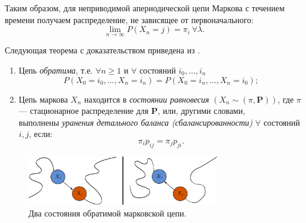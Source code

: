 \documentclass[14pt,a4paper]{article}
\begin{document}
Таким образом, для неприводимой апериодической цепи Маркова с течением времени получаем распределение, не зависящее от первоначального:
\begin{equation}
    \lim_{n \to \infty}P(X_n = j) = \pi_i\   \forall \lambda.
\end{equation}


Следующая теорема с доказательством приведена из \cite{kelb}.
\begin{Th}
\begin{enumerate} Пусть $X_n$ --- цепь Маркова. Следующие свойства эквивалентны:
    \item Цепь \textit{обратима}, т.е. $\forall n \geqslant 1$ и $\forall$ состояний $i_0, \dots, i_n$
    \begin{equation}
        P(X_0 = i_0, \dots, X_n = i_n) = P(X_0 = i_n, \dots, X_n = i_0);
    \end{equation}
    \item Цепь маркова $X_n$ находится в \textit{состоянии равновесия} $\left(X_n \sim (\pi, \mathbf{P})\right)$, где $\pi$ --- стационарное распределение для $\mathbf{P}$, или, другими словами,\\
    выполнены \textit{уранения детального баланса (сбалансированности)} $\forall$ состояний $i, j$, если:
    \begin{equation}
        \pi_i p_{i j} = \pi_j p_{j i}.
    \end{equation}
\end{enumerate}
\end{Th}


\begin{figure}[H]
    \centering
    \includegraphics[width=0.75\textwidth]{imgs/mcmc1.pdf}
    \caption{Два состояния обратимой марковской цепи.}
    \label{fig:my_label}
\end{figure}
\end{document}
